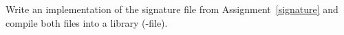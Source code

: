 \label{implementation}Write an implementation of the signature file from Assignment~\ref{signature} and compile both files into a library (-file).
